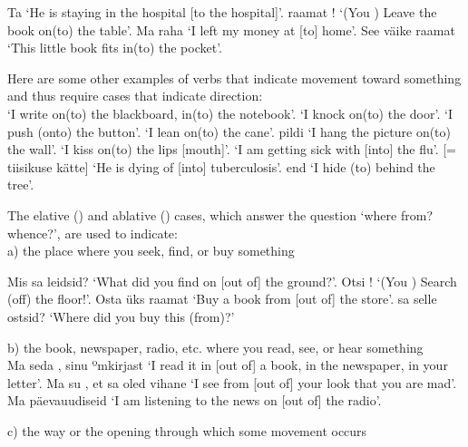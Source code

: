 Ta   `He is staying in the hospital [\lit to the hospital]'.  raamat ! `(You \sing) Leave the book on(to) the table'. Ma  raha  `I left my money at [to] home'. See väike raamat   `This little book fits in(to) the pocket'.

\newSection Here are some other examples of verbs that indicate movement toward something and thus require cases that indicate direction: \\

  `I write on(to) the blackboard, in(to) the notebook'.   `I knock on(to) the door'.   `I push (onto) the button'.   `I lean on(to) the cane'.  pildi  `I hang the picture on(to) the wall'.   `I kiss on(to) the lips [mouth]'.   `I am getting sick with [into] the flu'.   [= tiisikuse kätte] `He is dying of [into] tuberculosis'.  end  `I hide (to) behind the tree'.

\newSection The elative () and ablative () cases, which answer the question `where from? whence?', are used to indicate: \\

	\oneColumnTable
	a) the place where you seek, find, or buy something \\
	\tableEnd

Mis sa  leidsid? `What did you find on [out of] the ground?'. Otsi ! `(You \sing) Search (off) the floor!'. Osta  üks raamat `Buy a book from [out of] the store'.  sa selle ostsid? `Where did you \sing buy this (from)?'

\newSection b) the book, newspaper, radio, etc. where you read, see, or hear something \\

Ma  seda , sinu ºm{kirjast} `I read it in [out of] a book, in the newspaper, in your letter'. Ma  su , et sa oled vihane `I see from [out of] your look that you are mad'. Ma  päevauudiseid  `I am listening to the news on [out of] the radio'. 

\newSection c) the way or the opening through which some movement occurs \\

